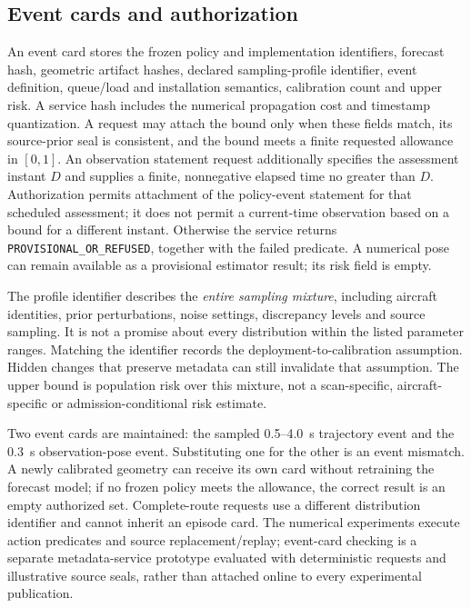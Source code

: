 \subsection{Event cards and authorization}
An event card stores the frozen policy and implementation identifiers, forecast hash, geometric artifact hashes, declared sampling-profile identifier, event definition, queue/load and installation semantics, calibration count and upper risk. A service hash includes the numerical propagation cost and timestamp quantization. A request may attach the bound only when these fields match, its source-prior seal is consistent, and the bound meets a finite requested allowance in $[0,1]$. An observation statement request additionally specifies the assessment instant $D$ and supplies a finite, nonnegative elapsed time no greater than $D$. Authorization permits attachment of the policy-event statement for that scheduled assessment; it does not permit a current-time observation based on a bound for a different instant. Otherwise the service returns \texttt{PROVISIONAL\_OR\_REFUSED}, together with the failed predicate. A numerical pose can remain available as a provisional estimator result; its risk field is empty.

The profile identifier describes the \emph{entire sampling mixture}, including aircraft identities, prior perturbations, noise settings, discrepancy levels and source sampling. It is not a promise about every distribution within the listed parameter ranges. Matching the identifier records the deployment-to-calibration assumption. Hidden changes that preserve metadata can still invalidate that assumption. The upper bound is population risk over this mixture, not a scan-specific, aircraft-specific or admission-conditional risk estimate.

Two event cards are maintained: the sampled 0.5--4.0~s trajectory event and the 0.3~s observation-pose event. Substituting one for the other is an event mismatch. A newly calibrated geometry can receive its own card without retraining the forecast model; if no frozen policy meets the allowance, the correct result is an empty authorized set. Complete-route requests use a different distribution identifier and cannot inherit an episode card. The numerical experiments execute action predicates and source replacement/replay; event-card checking is a separate metadata-service prototype evaluated with deterministic requests and illustrative source seals, rather than attached online to every experimental publication.

